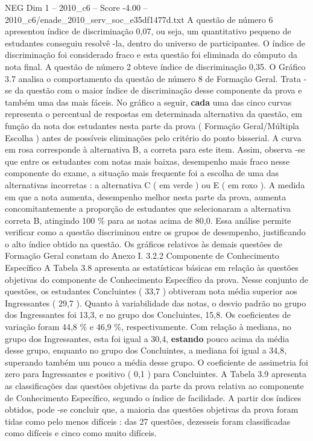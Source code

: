 \begin{textsample}{NEG Dim 1 – 2010\_c6 – Score -4.00 – 2010\_c6/enade\_2010\_serv\_soc\_e35df1477d.txt}
A questão de número 6 apresentou índice de discriminação 0,07, ou seja, um quantitativo pequeno de estudantes conseguiu resolvê -la, dentro do universo de participantes.
O índice de discriminação foi considerado fraco e esta questão foi eliminada do cômputo da nota final.
A questão de número 2 obteve índice de discriminação 0,35.
O Gráfico 3.7 analisa o comportamento da questão de número 8 de Formação Geral.
Trata -se da questão com o maior índice de discriminação desse componente da prova e também uma das mais fáceis.
No gráfico a seguir, \textbf{cada} uma das cinco curvas representa o percentual de respostas em determinada alternativa da questão, em função da nota dos estudantes nesta parte da prova ( Formação Geral/Múltipla Escolha ) antes de possíveis eliminações pelo critério do ponto bisserial.
A curva em rosa corresponde à alternativa B, a correta para este item.
Assim, observa -se que entre os estudantes com notas mais baixas, desempenho mais fraco nesse componente do exame, a situação mais frequente foi a escolha de uma das alternativas incorretas : a alternativa C ( em verde ) ou E ( em roxo ).
A medida em que a nota aumenta, desempenho melhor nesta parte da prova, aumenta concomitantemente a proporção de estudantes que selecionaram a alternativa correta B, atingindo 100 \% para as notas acima de 80,0.
Essa análise permite verificar como a questão discriminou entre os grupos de desempenho, justificando o alto índice obtido na questão.
Os gráficos relativos às demais questões de Formação Geral constam do Anexo I. 3.2.2 Componente de Conhecimento Específico A Tabela 3.8 apresenta as estatísticas básicas em relação às questões objetivas do componente de Conhecimento Específico da prova.
Nesse conjunto de questões, os estudantes Concluintes ( 33,7 ) obtiveram nota média superior aos Ingressantes ( 29,7 ).
Quanto à variabilidade das notas, o desvio padrão no grupo dos Ingressantes foi 13,3, e no grupo dos Concluintes, 15,8.
Os coeficientes de variação foram 44,8 \% e 46,9 \%, respectivamente.
Com relação à mediana, no grupo dos Ingressantes, esta foi igual a 30,4, \textbf{estando} pouco acima da média desse grupo, enquanto no grupo dos Concluintes, a mediana foi igual a 34,8, superando também um pouco a média desse grupo.
O coeficiente de assimetria foi zero para Ingressantes e positivo ( 0,1 ) para Concluintes.
A Tabela 3.9 apresenta as classificações das questões objetivas da parte da prova relativa ao componente de Conhecimento Específico, segundo o índice de facilidade.
A partir dos índices obtidos, pode -se concluir que, a maioria das questões objetivas da prova foram tidas como pelo menos difíceis : das 27 questões, dezesseis foram classificadas como difíceis e cinco como muito difíceis.

\end{textsample}
